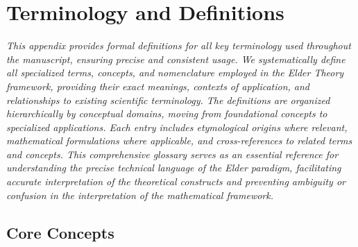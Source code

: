 \chapter{Terminology and Definitions}

\textit{This appendix provides formal definitions for all key terminology used throughout the manuscript, ensuring precise and consistent usage. We systematically define all specialized terms, concepts, and nomenclature employed in the Elder Theory framework, providing their exact meanings, contexts of application, and relationships to existing scientific terminology. The definitions are organized hierarchically by conceptual domains, moving from foundational concepts to specialized applications. Each entry includes etymological origins where relevant, mathematical formulations where applicable, and cross-references to related terms and concepts. This comprehensive glossary serves as an essential reference for understanding the precise technical language of the Elder paradigm, facilitating accurate interpretation of the theoretical constructs and preventing ambiguity or confusion in the interpretation of the mathematical framework.}

\section{Core Concepts}

